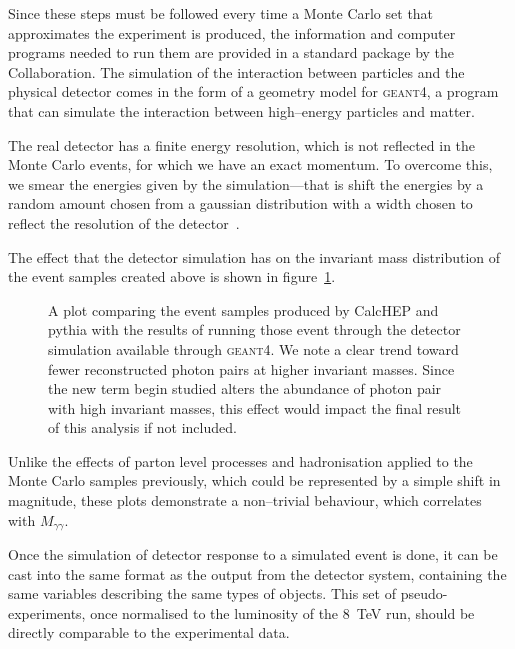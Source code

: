 Since these steps must be followed every time a Monte Carlo set that approximates the \atlas{} experiment is produced, the information and computer programs needed to run them are provided in a standard package by the \atlas{} Collaboration. The simulation of the interaction between particles and the physical detector comes in the form of a geometry model for \textsc{geant4}, a program that can simulate the interaction between high--energy particles and matter.

The real detector has a finite energy resolution, which is not reflected in the Monte Carlo events, for which we have an exact momentum. To overcome this, we smear the energies given by the simulation---that is shift the energies by a random amount chosen from a gaussian distribution with a width chosen to reflect the resolution of the detector~\cite{ecalib}.

The effect that the detector simulation has on the invariant mass distribution of the event samples created above is shown in figure~\ref{geant-beaf}.

\begin{figure}[htp]
\begin{minipage}[b]{.69\textwidth}
\begin{infilsf} \tiny

\end{infilsf}
\end{minipage}
\hfill\begin{minipage}[b]{.3\textwidth}
\caption{A plot comparing the event samples produced by CalcHEP and pythia with the results of running those event through the detector simulation available through \textsc{geant4}. We note a clear trend toward fewer reconstructed photon pairs at higher invariant masses. Since the new term begin studied alters the abundance of photon pair with high invariant masses, this effect would impact the final result of this analysis if not included. \label{geant-beaf}}
\end{minipage}
\end{figure}

Unlike the effects of parton level processes and hadronisation applied to the Monte Carlo samples previously, which could be represented by a simple shift in magnitude, these plots demonstrate a non--trivial behaviour, which correlates with $M_{\gamma\gamma}$.

Once the simulation of detector response to a simulated event is done, it can be cast into the same format as the output from the detector system, containing the same variables describing the same types of objects. This set of pseudo-experiments, once normalised to the luminosity of the 8~TeV run, should be directly comparable to the experimental data.